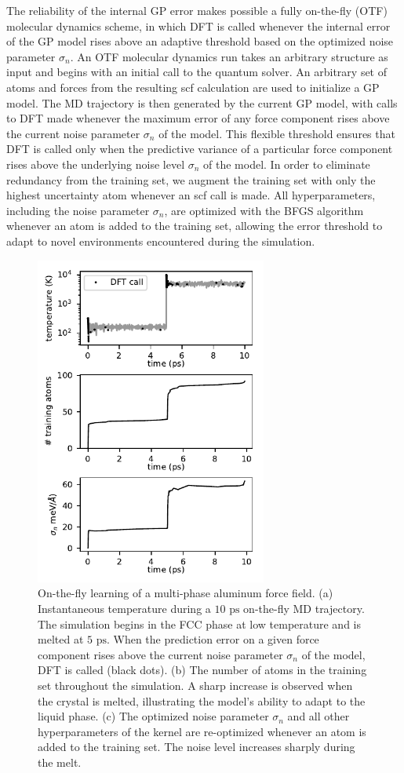 \documentclass[%
superscriptaddress,
preprint,
linenumbers,
amsmath,amssymb,
aps,
prl,
]{revtex4-1}
\begin{document}
The reliability of the internal GP error makes possible a fully on-the-fly (OTF) molecular dynamics scheme, in which DFT is called whenever the internal error of the GP model rises above an adaptive threshold based on the optimized noise parameter $\sigma_n$. An OTF molecular dynamics run takes an arbitrary structure as input and begins with an initial call to the quantum solver. An arbitrary set of atoms and forces from the resulting scf calculation are used to initialize a GP model. The MD trajectory is then generated by the current GP model, with calls to DFT made whenever the maximum error of any force component rises above the current noise parameter $\sigma_n$ of the model. This flexible threshold ensures that DFT is called only when the predictive variance of a particular force component rises above the underlying noise level $\sigma_n$ of the model. In order to eliminate redundancy from the training set, we augment the training set with only the highest uncertainty atom whenever an scf call is made. All hyperparameters, including the noise parameter $\sigma_n$, are optimized with the BFGS algorithm whenever an atom is added to the training set, allowing the error threshold to adapt to novel environments encountered during the simulation.

\begin{figure}
	\centering
	\includegraphics[width=3in]{melt.pdf}
	\caption{On-the-fly learning of a multi-phase aluminum force field. (a) Instantaneous temperature during a $10 \text{ ps}$ on-the-fly MD trajectory. The simulation begins in the FCC phase at low temperature and is melted at $5 \text{ ps}$. When the prediction error on a given force component rises above the current noise parameter $\sigma_n$ of the model, DFT is called (black dots). (b) The number of atoms in the training set throughout the simulation. A sharp increase is observed when the crystal is melted, illustrating the model's ability to adapt to the liquid phase. (c) The optimized noise parameter $\sigma_n$ and all other hyperparameters of the kernel are re-optimized whenever an atom is added to the training set. The noise level increases sharply during the melt.}
\end{figure}
\end{document}
